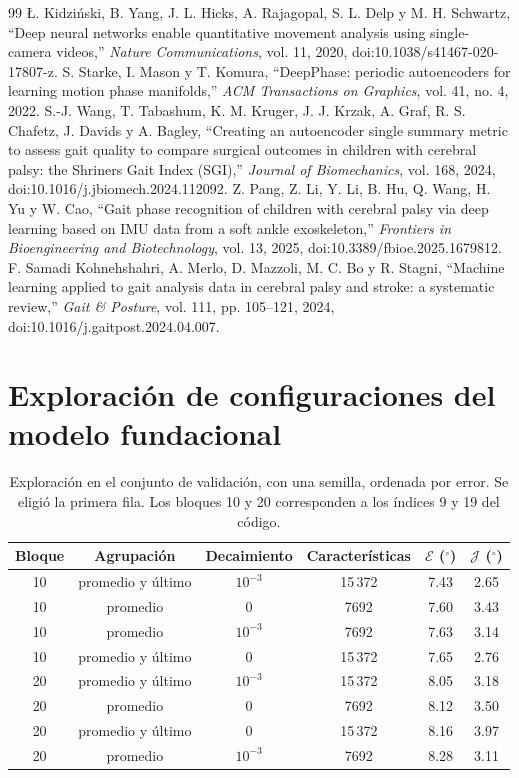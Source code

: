 \documentclass[11pt,a4paper]{article}
\newcommand{\gr}{$^{\circ}$}
\begin{document}
\begin{thebibliography}{99}
 \L. Kidzi\'nski, B. Yang, J. L. Hicks, A. Rajagopal, S. L. Delp y M. H. Schwartz, ``Deep neural networks enable quantitative movement analysis using single-camera videos,'' \emph{Nature Communications}, vol. 11, 2020, doi:10.1038/s41467-020-17807-z.
 S. Starke, I. Mason y T. Komura, ``DeepPhase: periodic autoencoders for learning motion phase manifolds,'' \emph{ACM Transactions on Graphics}, vol. 41, no. 4, 2022.
 S.-J. Wang, T. Tabashum, K. M. Kruger, J. J. Krzak, A. Graf, R. S. Chafetz, J. Davids y A. Bagley, ``Creating an autoencoder single summary metric to assess gait quality to compare surgical outcomes in children with cerebral palsy: the Shriners Gait Index (SGI),'' \emph{Journal of Biomechanics}, vol. 168, 2024, doi:10.1016/j.jbiomech.2024.112092.
 Z. Pang, Z. Li, Y. Li, B. Hu, Q. Wang, H. Yu y W. Cao, ``Gait phase recognition of children with cerebral palsy via deep learning based on IMU data from a soft ankle exoskeleton,'' \emph{Frontiers in Bioengineering and Biotechnology}, vol. 13, 2025, doi:10.3389/fbioe.2025.1679812.
 F. Samadi Kohnehshahri, A. Merlo, D. Mazzoli, M. C. Bo y R. Stagni, ``Machine learning applied to gait analysis data in cerebral palsy and stroke: a systematic review,'' \emph{Gait \& Posture}, vol. 111, pp. 105--121, 2024, doi:10.1016/j.gaitpost.2024.04.007.
\end{thebibliography}

\clearpage
\appendix

\section{Exploración de configuraciones del modelo fundacional}
\label{app:timesfm}

\begin{table}[h]
\centering\small
\begin{tabular}{cccccc}
\toprule
Bloque & Agrupación & Decaimiento & Características & $\mathcal E$ (\gr) & $\mathcal J$ (\gr) \\
\midrule
10 & promedio y último & $10^{-3}$ & 15\,372 & 7.43 & 2.65 \\
10 & promedio & 0 & 7692 & 7.60 & 3.43 \\
10 & promedio & $10^{-3}$ & 7692 & 7.63 & 3.14 \\
10 & promedio y último & 0 & 15\,372 & 7.65 & 2.76 \\
20 & promedio y último & $10^{-3}$ & 15\,372 & 8.05 & 3.18 \\
20 & promedio & 0 & 7692 & 8.12 & 3.50 \\
20 & promedio y último & 0 & 15\,372 & 8.16 & 3.97 \\
20 & promedio & $10^{-3}$ & 7692 & 8.28 & 3.11 \\
\bottomrule
\end{tabular}
\caption{Exploración en el conjunto de validación, con una semilla, ordenada por error. Se eligió la primera fila. Los bloques 10 y 20 corresponden a los índices 9 y 19 del código.}
\end{table}
\end{document}
